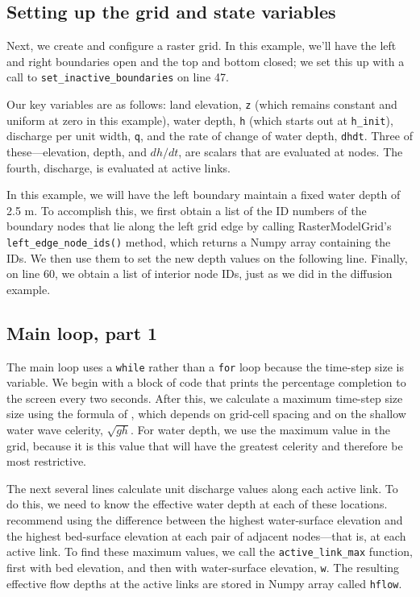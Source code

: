 \documentclass[12pt]{article}
\newcommand{\code}[1]{{\tt #1}}
\begin{document}
\newpage
\subsection{Setting up the grid and state variables}



Next, we create and configure a raster grid. In this example, we'll have the left and right boundaries open and the top and bottom closed; we set this up with a call to \code{set\_inactive\_boundaries} on line 47.

Our key variables are as follows: land elevation, \code{z} (which remains constant and uniform at zero in this example), water depth, \code{h} (which starts out at \code{h\_init}), discharge per unit width, \code{q}, and the rate of change of water depth, \code{dhdt}. Three of these---elevation, depth, and $dh/dt$, are scalars that are evaluated at nodes. The fourth, discharge, is evaluated at active links.

In this example, we will have the left boundary maintain a fixed water depth of 2.5 m. To accomplish this, we first obtain a list of the ID numbers of the boundary nodes that lie along the left grid edge by calling RasterModelGrid's \code{left\_edge\_node\_ids()} method, which returns a Numpy array containing the IDs. We then use them to set the new depth values on the following line. Finally, on line 60, we obtain a list of interior node IDs, just as we did in the diffusion example.

\subsection{Main loop, part 1}



The main loop uses a \code{while} rather than a \code{for} loop because the time-step size is variable. We begin with a block of code that prints the percentage completion to the screen every two seconds. After this, we calculate a maximum time-step size size using the formula of \citet{bates2010simple}, which depends on grid-cell spacing and on the shallow water wave celerity, $\sqrt{g h}$. For water depth, we use the maximum value in the grid, because it is this value that will have the greatest celerity and therefore be most restrictive.

The next several lines calculate unit discharge values along each active link. To do this, we need to know the effective water depth at each of these locations. \citet{bates2010simple} recommend using the difference between the highest water-surface elevation and the highest bed-surface elevation at each pair of adjacent nodes---that is, at each active link. To find these maximum values, we call the \code{active\_link\_max} function, first with bed elevation, and then with water-surface elevation, \code{w}. The resulting effective flow depths at the active links are stored in Numpy array called \code{hflow}. 
\end{document}
